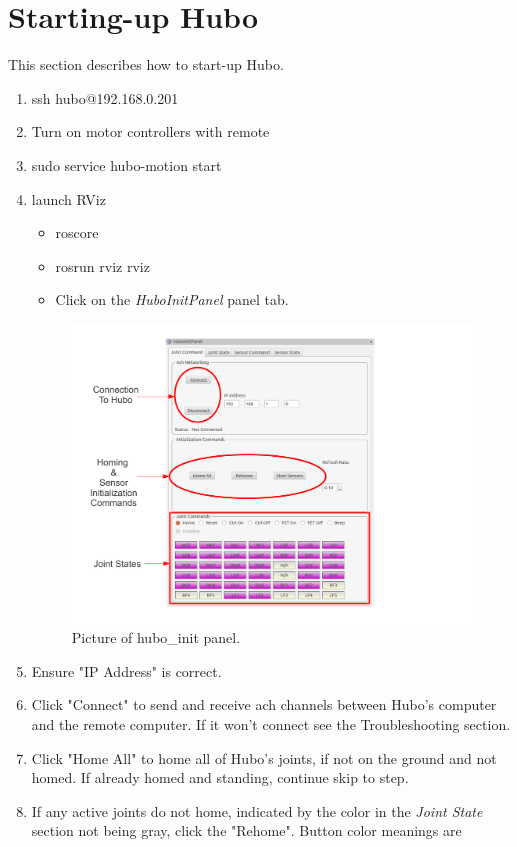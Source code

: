 \documentclass[letterpaper, 10 pt]{report}
\begin{document}
\section{Starting-up Hubo}
This section describes how to start-up Hubo.
\begin{enumerate}
  \item ssh hubo@192.168.0.201
  \item Turn on motor controllers with remote
  \item sudo service hubo-motion start
  \item launch RViz
    \begin{itemize}
    	  \item roscore
    	  \item rosrun rviz rviz
    	  \item Click on the \textit{HuboInitPanel} panel tab.
    \end{itemize}
  \begin{figure}[ht]
    \centering
    \includegraphics[width=15.0cm]{figures/hubo-init.pdf}
    \caption{Picture of hubo\_init panel.}
    \label{fig:hubo-init-image}
  \end{figure}
  \item Ensure "IP Address" is correct.
  \item Click "Connect" to send and receive ach channels between Hubo's computer and the remote computer. If it won't connect see the Troubleshooting section.
  \item Click "Home All" to home all of Hubo's joints, if not on the ground and not homed. If already homed and standing, continue skip to step.
  \item If any active joints do not home, indicated by the color in the \textit{Joint State} section not being gray, click the "Rehome". Button color meanings are

\end{enumerate}
\end{document}
